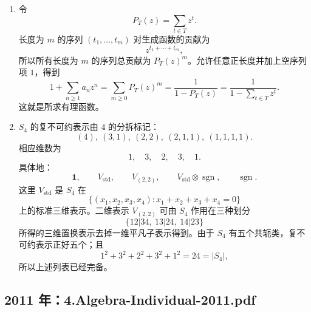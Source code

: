 \documentclass[UTF8,12pt]{ctexart}
\begin{document}
\begin{enumerate}[label=\textbf{\arabic*.},leftmargin=2.2em]
\item 令
\[
P_T(z)=\sum_{t\in T}z^t.
\]
长度为 \(m\) 的序列 \((t_1,\ldots,t_m)\) 对生成函数的贡献为
\[
z^{t_1+\cdots+t_m},
\]
所以所有长度为 \(m\) 的序列总贡献为 \(P_T(z)^m\)。允许任意正长度并加上空序列项 \(1\)，得到
\[
1+\sum_{n\ge1}a_nz^n
=\sum_{m\ge0}P_T(z)^m
=\frac1{1-P_T(z)}
=\frac1{1-\sum_{t\in T}z^t}.
\]
这就是所求有理函数。

\item \(S_4\) 的复不可约表示由 \(4\) 的分拆标记：
\[
(4),\ (3,1),\ (2,2),\ (2,1,1),\ (1,1,1,1).
\]
相应维数为
\[
1,\quad3,\quad2,\quad3,\quad1.
\]
具体地：
\[
\mathbf 1,\qquad
V_{\mathrm{std}},\qquad
V_{(2,2)},\qquad
V_{\mathrm{std}}\otimes\operatorname{sgn},\qquad
\operatorname{sgn}.
\]
这里 \(V_{\mathrm{std}}\) 是 \(S_4\) 在
\[
\{(x_1,x_2,x_3,x_4):x_1+x_2+x_3+x_4=0\}
\]
上的标准三维表示。二维表示 \(V_{(2,2)}\) 可由 \(S_4\) 作用在三种划分
\[
\{12|34,\ 13|24,\ 14|23\}
\]
所得的三维置换表示去掉一维平凡子表示得到。由于 \(S_4\) 有五个共轭类，复不可约表示正好五个；且
\[
1^2+3^2+2^2+3^2+1^2=24=|S_4|,
\]
所以上述列表已经完备。
\end{enumerate}


\subsection{2011 年：4.Algebra-Individual-2011.pdf}
\end{document}
